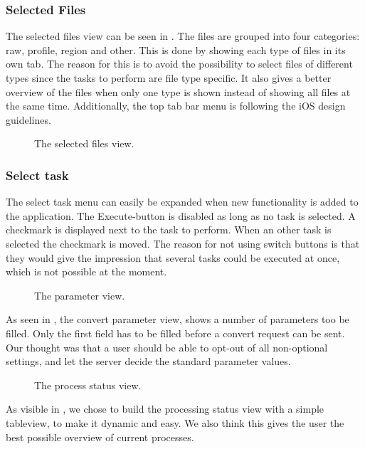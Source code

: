 \subsubsection{Selected Files}
The selected files view can be seen in . The files are grouped into four categories: raw, profile, region and other. This is done by showing each type of files in its own tab. The reason for this is to avoid the possibility to select files of different types since the tasks to perform are file type specific. It also gives a better overview of the files when only one type is shown instead of showing all files at the same time. Additionally, the top tab bar menu is following the iOS design guidelines.

\begin{figure}[ht]
\caption{The selected files view.}
\label{fig:ios_selectedFiles2}
\end{figure}
\FloatBarrier

\subsubsection{Select task}
The select task menu can easily be expanded when new functionality is added to the application. The Execute-button is disabled as long as no task is selected. A checkmark is displayed next to the task to perform. When an other task is selected the checkmark is moved. The reason for not using switch buttons is that they would give the impression that several tasks could be executed at once, which is not possible at the moment.
\begin{figure}[ht]
\caption{The parameter view.}
\label{fig:ios_convertParameters}
\end{figure}
\FloatBarrier

As seen in , the convert parameter view, shows a number of parameters too be filled. Only the first field has to be filled before a  convert request can be sent. Our thought was that a user should be able to opt-out of all non-optional settings, and let the server decide the standard parameter values. 

\begin{figure}[ht]
\caption{The process status view.}
\label{fig:ios_processingStatus}
\end{figure}
\FloatBarrier

As visible in , we chose to build the processing status view with a simple tableview, to make it dynamic and easy. We also think this gives the user the best possible overview of current processes.

\paragraph{}